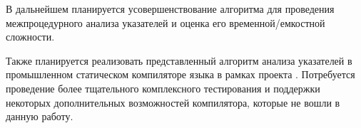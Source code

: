 \documentclass[14pt,titlepage,draft]{extarticle}
\newcommand{\java}{\eng{Java}\xspace}
\begin{document}
    В дальнейшем планируется усовершенствование алгоритма для проведения
    межпроцедурного анализа указателей и оценка его временной\slash{}емкостной
    сложности.

    Также планируется реализовать представленный алгоритм анализа
    указателей в промышленном статическом компиляторе языка \java в
    рамках проекта . Потребуется проведение более
    тщательного комплексного тестирования и поддержки некоторых дополнительных
    возможностей компилятора, которые не вошли в данную работу.

  
  
\end{document}
